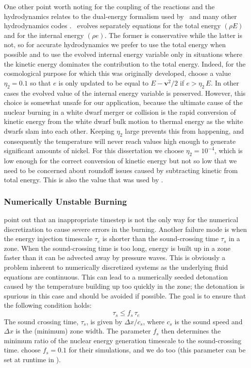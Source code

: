 \documentclass[12pt]{article}
\begin{document}
One other point worth noting for the coupling of the reactions
and the hydrodynamics relates to the dual-energy formalism used
by \castro\ and many other hydrodynamics codes \cite{bryan:1995}.
\castro\ evolves separately equations for the total energy $(\rho E)$ and
for the internal energy $(\rho e)$. The former is conservative while the latter
is not, so for accurate hydrodynamics we prefer to use the total
energy when possible and to use the evolved internal energy variable
only in situations where the kinetic energy dominates the contribution
to the total energy. Indeed, for the cosmological purpose for which
this was originally developed, \cite{ENZO} choose a value $\eta_2 = 0.1$
so that $e$ is only updated to be equal to $E - \mathbf{v}^2/2$ if
$e > \eta_2\, E$. In other cases the evolved value of the internal
energy variable is preserved. However, this choice is somewhat unsafe
for our application, because the ultimate cause of the nuclear
burning in a white dwarf merger or collision is the rapid conversion of
kinetic energy from the white dwarf bulk motion to thermal energy
as the white dwarfs slam into each other. Keeping $\eta_2$ large
prevents this from happening, and consequently the temperature
will never reach values high enough to generate significant
amounts of nickel. For this dissertation we choose $\eta_2 = 10^{-4}$,
which is low enough for the correct conversion of kinetic energy
but not so low that we need to be concerned about roundoff issues
caused by subtracting kinetic from total energy. This is also
the value that was used by \cite{hawley:2012}.

\subsubsection{Numerically Unstable Burning}
\label{sec:unstable_burning}

\citet{kushnir:2013} point out that an inappropriate timestep is 
not the only way for the numerical discretization to cause 
severe errors in the burning. Another failure mode is when
the energy injection timescale
$\tau_e$ is shorter than the sound-crossing time $\tau_s$ in a zone.
When the sound-crossing time is too long, energy is built up in
a zone faster than it can be advected away by pressure waves.
This is obviously a problem inherent to numerically discretized
systems as the underlying fluid equations are continuous.
This can lead to a numerically seeded detonation caused by the
temperature building up too quickly in the zone; the detonation
is spurious in this case and should be avoided if possible.
The goal is to ensure that the following condition holds:
\begin{equation}
  \tau_s \leq f_{s}\, \tau_e \label{eq:burning_limiter_2}
\end{equation}
The sound crossing time, $\tau_s$, is given by $\Delta x / c_s$, 
where $c_s$ is the sound speed and $\Delta x$ is the (minimum) 
zone width. The parameter $f_{s}$ then determines the minimum
ratio of the nuclear energy generation timescale to the 
sound-crossing time. \citet{kushnir:2013} choose $f_{s} = 0.1$ 
for their simulations, and we do too (this parameter can be set 
at runtime in \castro).
\end{document}
